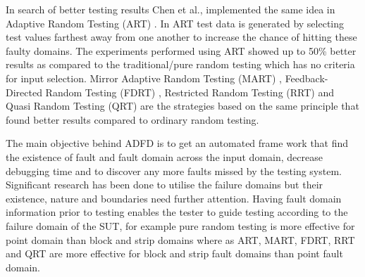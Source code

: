 \documentclass{acm_proc_article-sp}
\begin{document}
In search of better testing results Chen et al., implemented the same idea in Adaptive Random Testing (ART) \cite{Chen2008}. In ART test data is generated by selecting test values farthest away from one another to increase the chance of hitting these faulty domains. The experiments performed using ART showed up to 50\% better results as compared to the traditional/pure random testing which has no criteria for input selection. Mirror Adaptive Random Testing (MART)  \cite{Chen2003}, 
Feedback-Directed Random Testing (FDRT) \cite{Pacheco2007}, 
Restricted Random Testing (RRT) \cite{Chan2002} and Quasi Random Testing  (QRT) \cite{Chen2005} 
are the strategies based on the same principle that found better results compared to ordinary random testing.


The main objective behind ADFD is to get an automated frame work that find the existence of fault and fault domain across the input domain, decrease debugging time and to discover any more faults missed by the testing system. Significant research has been done to utilise the failure domains but their existence, nature and boundaries need further attention. Having fault domain information prior to testing enables the tester to guide testing according to the failure domain of the SUT, for example pure random testing is more effective for point domain than block and strip domains where as ART, MART, FDRT, RRT and QRT are more effective for block and strip fault domains than point fault domain.

\end{document}
